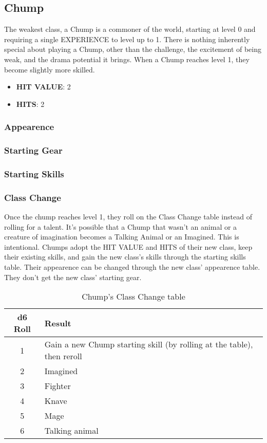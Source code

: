 \subsection{Chump}
The weakest class, a Chump is a commoner of the world, starting at level 0 and requiring a single EXPERIENCE to level up to 1. There is nothing inherently special about playing a Chump, other than the challenge, the excitement of being weak, and the drama potential it brings. When a Chump reaches level 1, they become slightly more skilled.

\begin{multicols}[2]
\begin{itemize}
  \item \textbf{HIT VALUE}: 2
  \item \textbf{HITS}: 2
\end{itemize}

\subsubsection*{Appearence}


\subsubsection*{Starting Gear}


\subsubsection*{Starting Skills}


\subsubsection*{Class Change}
Once the chump reaches level 1, they roll on the Class Change table instead of rolling for a talent. It's possible that a Chump that wasn't an animal or a creature of imagination becomes a Talking Animal or an Imagined. This is intentional. Chumps adopt the HIT VALUE and HITS of their new class, keep their existing skills, and gain the new class's skills through the starting skills table. Their appearence can be changed through the new class' appearence table. They don't get the new class' starting gear.

\end{multicols}

\begin{table}[b!]
\centering
\begin{tabular}{|c|l|}
\hline
\textbf{d6 Roll} & \textbf{Result} \\
\hline
1 & Gain a new Chump starting skill (by rolling at the table), then reroll \\
2 & Imagined \\
3 & Fighter \\
4 & Knave \\
5 & Mage \\
6 & Talking animal \\
\hline
\end{tabular}
\caption{Chump's Class Change table}
\label{tab:chump_change}
\end{table}
